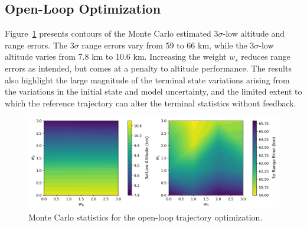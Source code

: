 \subsection{Open-Loop Optimization}
Figure~\ref{Fig:MCResultsOpenLoop} presents contours of the Monte Carlo estimated 3$\sigma$-low altitude and range errors. The 3$\sigma$ range errors vary from 59 to 66 km, while the 3$\sigma$-low altitude varies from 7.8 km to 10.6 km. Increasing the weight $w_s$ reduces range errors as intended, but comes at a penalty to altitude performance. The results also highlight the large magnitude of the terminal state variations arising from the variations in the initial state and model uncertainty, and the limited extent to which the reference trajectory can alter the terminal statistics without feedback.
\begin{figure}[h!]
	\centering
	\includegraphics[width=1\textwidth]{Images/OpenLoop_WeightSweepMCResults}
	\caption{Monte Carlo statistics for the open-loop trajectory optimization. }
	\label{Fig:MCResultsOpenLoop}
\end{figure}

